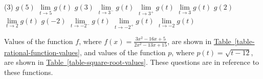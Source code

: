 \documentclass[12pt,]{book}
\theoremstyle{plain}
\theoremstyle{definition}
\theoremstyle{definition}
\theoremstyle{definition}
\theoremstyle{definition}
\theoremstyle{definition}
\numberwithin{equation}{section}
\newcommand{\fe}[2]{#1\mathopen{}\left(#2\right)\mathclose{}}
\begin{document}
\begin{exercisegroup}(3)
\exercise[2.]\hypertarget{exercise-47}{}\(\fe{g}{5}\)%
\exercise[3.]\hypertarget{exercise-48}{}\(\lim\limits_{t\to5}\fe{g}{t}\)%
\exercise[4.]\hypertarget{exercise-49}{}\(\fe{g}{3}\)%
\exercise[5.]\hypertarget{exercise-50}{}\(\lim\limits_{t\to3^{-}}\fe{g}{t}\)%
\exercise[6.]\hypertarget{exercise-51}{}\(\lim\limits_{t\to3^{+}}\fe{g}{t}\)%
\exercise[7.]\hypertarget{exercise-52}{}\(\lim\limits_{t\to3}\fe{g}{t}\)%
\exercise[8.]\hypertarget{exercise-53}{}\(\fe{g}{2}\)%
\exercise[9.]\hypertarget{exercise-54}{}\(\lim\limits_{t\to2}\fe{g}{t}\)%
\exercise[10.]\hypertarget{exercise-55}{}\(\fe{g}{-2}\)%
\exercise[11.]\hypertarget{exercise-56}{}\(\lim\limits_{t\to-2^{-}}\fe{g}{t}\)%
\exercise[12.]\hypertarget{exercise-57}{}\(\lim\limits_{t\to-2^{+}}\fe{g}{t}\)%
\exercise[13.]\hypertarget{exercise-58}{}\(\lim\limits_{t\to-2}\fe{g}{t}\)%
\end{exercisegroup}
\par\smallskip\noindent
\hypertarget{exercisegroup-14}{}\par\noindent Values of the function \(f\), where \(\fe{f}{x}=\frac{3x^2-16x+5}{2x^2-13x+15}\), are shown in \hyperref[table-rational-function-values]{Table~\ref{table-rational-function-values}}, and values of the function \(p\), where \(\fe{p}{t}=\sqrt{t-12}\), are shown in \hyperref[table-square-root-values]{Table~\ref{table-square-root-values}}. These questions are in reference to these functions.%
\end{document}
